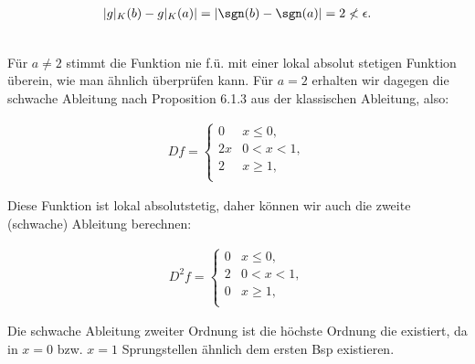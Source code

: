 \begin{solution}
\begin{align*}
  |g|_K(b) - g|_K(a)| = |\sgn(b) - \sgn(a)| = 2 \nless \epsilon.
\end{align*}

\\

Für $a \neq 2$ stimmt die Funktion nie f.ü. mit einer lokal absolut stetigen
Funktion überein, wie man ähnlich überprüfen kann. Für $a=2$ erhalten wir
dagegen die schwache Ableitung nach Proposition 6.1.3 aus der klassischen
Ableitung, also:

\begin{align*}
  Df=
  \begin{cases}
  0 & x \leq 0, \\
  2x & 0 < x < 1, \\
  2 & x \geq 1, \\
  \end{cases}
\end{align*}

Diese Funktion ist lokal absolutstetig, daher können wir auch die zweite (schwache)
Ableitung berechnen:

\begin{align*}
  D^2f=
  \begin{cases}
  0 & x \leq 0, \\
  2 & 0 < x < 1, \\
  0 & x \geq 1, \\
  \end{cases}
\end{align*}

Die schwache Ableitung zweiter Ordnung ist die höchste Ordnung die existiert,
da in $x=0$ bzw. $x=1$ Sprungstellen ähnlich dem ersten Bsp existieren.

\\



\end{solution}
